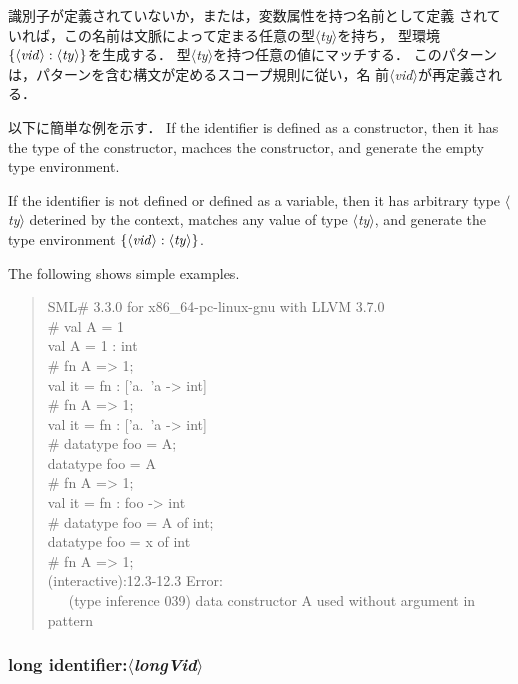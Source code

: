 \documentclass{jbook}
\newcommand{\txt}[2]{#2}
\newcommand{\version}{3.3.0}
\newcommand{\nonterm}[1]{\mbox{$\langle$}{\it #1}\mbox{$\rangle$}}
\newenvironment{program}{\begin{quote}\begin{tt}}%
                        {\end{tt}\end{quote}}
\begin{document}
	識別子が定義されていないか，または，変数属性を持つ名前として定義
されていれば，この名前は文脈によって定まる任意の型\nonterm{ty}を持ち，
型環境$\{\nonterm{vid} : \nonterm{ty}\}$を生成する．
	型\nonterm{ty}を持つ任意の値にマッチする．
	このパターンは，パターンを含む構文が定めるスコープ規則に従い，名
前\nonterm{vid}が再定義される．
	
	以下に簡単な例を示す．
\else%
	If the identifier is defined as a constructor, then it has the
type of the constructor, machces the constructor, and generate the empty
type environment.

	If the identifier is not defined or defined as a variable, then
it has arbitrary type \nonterm{ty} deterined by the context, matches any
value of type \nonterm{ty}, and generate the type environment
$\{\nonterm{vid} : \nonterm{ty}\}$. 
	
	The following shows simple examples.
\fi%
\begin{program}
SML\# \version{} for x86\_64-pc-linux-gnu with LLVM 3.7.0
\\
\# val A = 1
\\
val A = 1 : int
\\
\# fn A => 1;
\\
val it = fn : ['a.~'a -> int]
\\
\# fn A => 1;
\\
val it = fn : ['a.~'a -> int]
\\
\# datatype foo = A;
\\
datatype foo = A
\\
\# fn A => 1;
\\
val it = fn : foo -> int
\\
\# datatype foo = A of int;
\\
datatype foo = x of int
\\
\# fn A => 1;
\\
(interactive):12.3-12.3 Error:
\\
\ \ \  (type inference 039) data constructor A used without argument in pattern
\end{program}	

\subsubsection{\txt{long識別子パターン}{long identifier}:\nonterm{longVid}}
\end{document}
